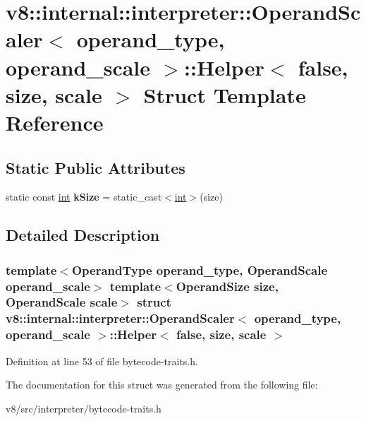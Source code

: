 \hypertarget{structv8_1_1internal_1_1interpreter_1_1OperandScaler_1_1Helper_3_01false_00_01size_00_01scale_01_4}{}\section{v8\+:\+:internal\+:\+:interpreter\+:\+:Operand\+Scaler$<$ operand\+\_\+type, operand\+\_\+scale $>$\+:\+:Helper$<$ false, size, scale $>$ Struct Template Reference}
\label{structv8_1_1internal_1_1interpreter_1_1OperandScaler_1_1Helper_3_01false_00_01size_00_01scale_01_4}
\subsection*{Static Public Attributes}
\begin{DoxyCompactItemize}
\item 
\mbox{\label{structv8_1_1internal_1_1interpreter_1_1OperandScaler_1_1Helper_3_01false_00_01size_00_01scale_01_4_a3c6f10cc1bb5cf02e066c91cafb8f473}} 
static const \mbox{\hyperlink{classint}{int}} {\bfseries k\+Size} = static\+\_\+cast$<$\mbox{\hyperlink{classint}{int}}$>$(size)
\end{DoxyCompactItemize}


\subsection{Detailed Description}
\subsubsection*{template$<$Operand\+Type operand\+\_\+type, Operand\+Scale operand\+\_\+scale$>$\newline
template$<$Operand\+Size size, Operand\+Scale scale$>$\newline
struct v8\+::internal\+::interpreter\+::\+Operand\+Scaler$<$ operand\+\_\+type, operand\+\_\+scale $>$\+::\+Helper$<$ false, size, scale $>$}



Definition at line 53 of file bytecode-\/traits.\+h.



The documentation for this struct was generated from the following file\+:\begin{DoxyCompactItemize}
\item 
v8/src/interpreter/bytecode-\/traits.\+h\end{DoxyCompactItemize}
